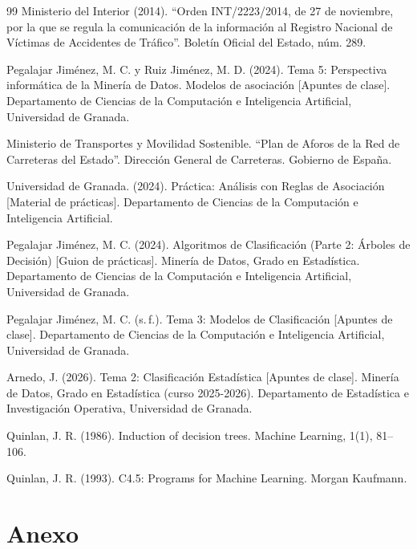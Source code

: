 \documentclass[twoside,a4paper,12pt,onecolumn,openany]{book}
\begin{document}
\begin{thebibliography}{99}
 Ministerio del Interior (2014). ``Orden INT/2223/2014, de 27 de noviembre, por la que se regula la comunicación de la información al Registro Nacional de Víctimas de Accidentes de Tráfico''. Boletín Oficial del Estado, núm. 289.

 Pegalajar Jiménez, M. C. y Ruiz Jiménez, M. D. (2024). Tema 5: Perspectiva informática de la Minería de Datos. Modelos de asociación [Apuntes de clase]. Departamento de Ciencias de la Computación e Inteligencia Artificial, Universidad de Granada.

 Ministerio de Transportes y Movilidad Sostenible. ``Plan de Aforos de la Red de Carreteras del Estado''. Dirección General de Carreteras. Gobierno de España.

 Universidad de Granada. (2024). Práctica: Análisis con Reglas de Asociación [Material de prácticas]. Departamento de Ciencias de la Computación e Inteligencia Artificial.

 Pegalajar Jiménez, M. C. (2024). Algoritmos de Clasificación (Parte 2: Árboles de Decisión) [Guion de prácticas]. Minería de Datos, Grado en Estadística. Departamento de Ciencias de la Computación e Inteligencia Artificial, Universidad de Granada.

 Pegalajar Jiménez, M. C. (s.\,f.). Tema 3: Modelos de Clasificación [Apuntes de clase]. Departamento de Ciencias de la Computación e Inteligencia Artificial, Universidad de Granada.

 Arnedo, J. (2026). Tema 2: Clasificación Estadística [Apuntes de clase]. Minería de Datos, Grado en Estadística (curso 2025-2026). Departamento de Estadística e Investigación Operativa, Universidad de Granada.

 Quinlan, J. R. (1986). Induction of decision trees. Machine Learning, 1(1), 81--106.

 Quinlan, J. R. (1993). C4.5: Programs for Machine Learning. Morgan Kaufmann.


\end{thebibliography}
\newpage
\chapter*{Anexo}
\setcounter{table}{0}
\renewcommand{\thetable}{A.\arabic{table}}
\end{document}
